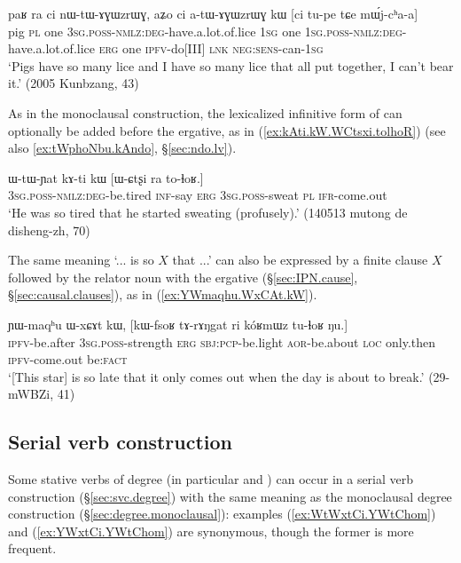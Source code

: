 \begin{exe}
\ex \label{ex:atAGWzrWG.kW}
\gll paʁ ra ci nɯ-tɯ-ɤɣɯzrɯɣ, aʑo ci a-tɯ-ɤɣɯzrɯɣ kɯ [ci tu-pe tɕe mɯ́j-cʰa-a] \\
pig \textsc{pl} one \textsc{3sg}.\textsc{poss}-\textsc{nmlz}:\textsc{deg}-have.a.lot.of.lice \textsc{1sg} one \textsc{1sg}.\textsc{poss}-\textsc{nmlz}:\textsc{deg}-have.a.lot.of.lice \textsc{erg} one \textsc{ipfv}-do[III] \textsc{lnk} \textsc{neg}:\textsc{sens}-can-\textsc{1sg} \\
\glt `Pigs have so many lice and I have so many lice that all put together, I can't bear it.' (2005 Kunbzang, 43)
\end{exe}

As in the monoclausal construction, the lexicalized infinitive form  of  can optionally be added before the ergative, as in (\ref{ex:kAti.kW.WCtsxi.tolhoR}) (see also \ref{ex:tWphoNbu.kAndo}, §\ref{sec:ndo.lv}).
 
\begin{exe}
\ex \label{ex:kAti.kW.WCtsxi.tolhoR}
\gll ɯ-tɯ-ɲat kɤ-ti kɯ [ɯ-ɕtʂi ra to-ɬoʁ.] \\
\textsc{3sg}.\textsc{poss}-\textsc{nmlz}:\textsc{deg}-be.tired \textsc{inf}-say \textsc{erg} \textsc{3sg}.\textsc{poss}-sweat \textsc{pl} \textsc{ifr}-come.out \\
\glt `He was so tired that he started sweating (profusely).' (140513 mutong de disheng-zh, 70)
\end{exe}

The same meaning `... is so $X$ that ...' can also be expressed by a finite clause $X$ followed by the relator noun  with the ergative  (§\ref{sec:IPN.cause}, §\ref{sec:causal.clauses}), as in (\ref{ex:YWmaqhu.WxCAt.kW}). 

\begin{exe}
\ex \label{ex:YWmaqhu.WxCAt.kW}
\gll ɲɯ-maqʰu ɯ-xɕɤt kɯ, [kɯ-fsoʁ tɤ-rɤŋgat ri kóʁmɯz tu-ɬoʁ ŋu.] \\
\textsc{ipfv}-be.after \textsc{3sg}.\textsc{poss}-strength \textsc{erg} \textsc{sbj}:\textsc{pcp}-be.light \textsc{aor}-be.about \textsc{loc} only.then \textsc{ipfv}-come.out be:\textsc{fact} \\
\glt `[This star] is so late that it only comes out when the day is about to break.' (29-mWBZi, 41)
\end{exe}


\subsection{Serial verb construction} \label{sec:degree.svc}
Some stative verbs of degree (in particular  and ) can occur in a serial verb construction (§\ref{sec:svc.degree}) with the same meaning as the monoclausal degree construction (§\ref{sec:degree.monoclausal}): examples (\ref{ex:WtWxtCi.YWtChom}) and (\ref{ex:YWxtCi.YWtChom}) are synonymous, though the former is more frequent.


